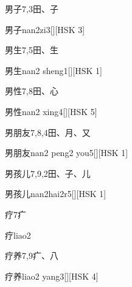 \begin{Entry}{男子}{7,3}{⽥、⼦}
  \begin{Phonetics}{男子}{nan2zi3}[][HSK 3]
  \end{Phonetics}
\end{Entry}

\begin{Entry}{男生}{7,5}{⽥、⽣}
  \begin{Phonetics}{男生}{nan2 sheng1}[][HSK 1]
  \end{Phonetics}
\end{Entry}

\begin{Entry}{男性}{7,8}{⽥、⼼}
  \begin{Phonetics}{男性}{nan2 xing4}[][HSK 5]
  \end{Phonetics}
\end{Entry}

\begin{Entry}{男朋友}{7,8,4}{⽥、⽉、⼜}
  \begin{Phonetics}{男朋友}{nan2 peng2 you5}[][HSK 1]
  \end{Phonetics}
\end{Entry}

\begin{Entry}{男孩儿}{7,9,2}{⽥、⼦、⼉}
  \begin{Phonetics}{男孩儿}{nan2hai2r5}[][HSK 1]
  \end{Phonetics}
\end{Entry}

\begin{Entry}{疗}{7}{⽧}
  \begin{Phonetics}{疗}{liao2}
  \end{Phonetics}
\end{Entry}

\begin{Entry}{疗养}{7,9}{⽧、⼋}
  \begin{Phonetics}{疗养}{liao2 yang3}[][HSK 4]
  \end{Phonetics}
\end{Entry}

